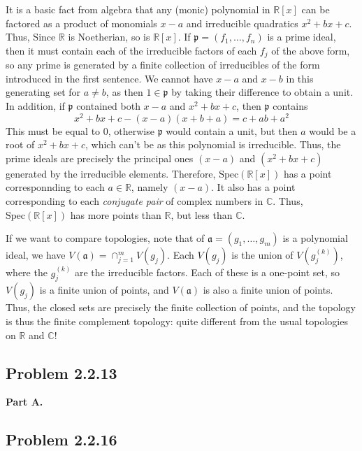 \documentclass[aps,pra,showpacs,notitlepage,onecolumn,superscriptaddress,nofootinbib]{revtex4-1}
\theoremstyle{definition}
\begin{document}
\noindent It is a basic fact from algebra that any (monic) polynomial in $\mathbb{R}[x]$ can be factored as a product of monomials $x - a$ and irreducible quadratics $x^2 + bx + c$. Thus, Since $\mathbb{R}$ is
  Noetherian, so is $\mathbb{R}[x]$. If $\mathfrak{p} = (f_1, \dots, f_n)$ is a prime ideal, then it must contain each of the irreducible factors of each $f_j$ of the above form, so any prime is generated
  by a finite collection of irreducibles of the form introduced in the first sentence. We cannot have $x - a$ and $x - b$ in this generating set for $a \neq b$, as then $1 \in \mathfrak{p}$ by taking their difference
  to obtain a unit. In addition, if $\mathfrak{p}$ contained both $x - a$ and $x^2 + bx + c$, then $\mathfrak{p}$ contains
  \begin{equation}
    x^2 + bx + c - (x - a)(x + b + a) = c + ab + a^2
    \end{equation}
  This must be equal to $0$, otherwise $\mathfrak{p}$ would contain a unit, but then $a$ would be a root of $x^2 + bx + c$, which can't be as this polynomial is irreducible. Thus, the prime ideals are precisely the
  principal ones $(x - a)$ and $(x^2 + bx + c)$ generated by the irreducible elements. Therefore, $\text{Spec}(\mathbb{R}[x])$ has a point corresponnding to each $a \in \mathbb{R}$, namely $(x - a)$. It also
  has a point corresponding to each \emph{conjugate pair} of complex numbers in $\mathbb{C}$. Thus, $\text{Spec}(\mathbb{R}[x])$ has more points than $\mathbb{R}$, but less than $\mathbb{C}$.

  If we want to compare topologies, note that of $\mathfrak{a} = (g_1, \dots, g_m)$ is a polynomial ideal, we have $V(\mathfrak{a}) = \cap_{j = 1}^{m} V(g_j)$. Each $V(g_j)$ is the union of $V(g_j^{(k)})$, where
  the $g_j^{(k)}$ are the irreducible factors. Each of these is a one-point set, so $V(g_j)$ is a finite union of points, and $V(\mathfrak{a})$ is also a finite union of points. Thus, the closed sets are precisely
  the finite collection of points, and the topology is thus the finite complement topology: quite different from the usual topologies on $\mathbb{R}$ and $\mathbb{C}$!

  \subsection{Problem 2.2.13}

  \noindent \textbf{Part A.} 

  \subsection{Problem 2.2.16}
\end{document}
